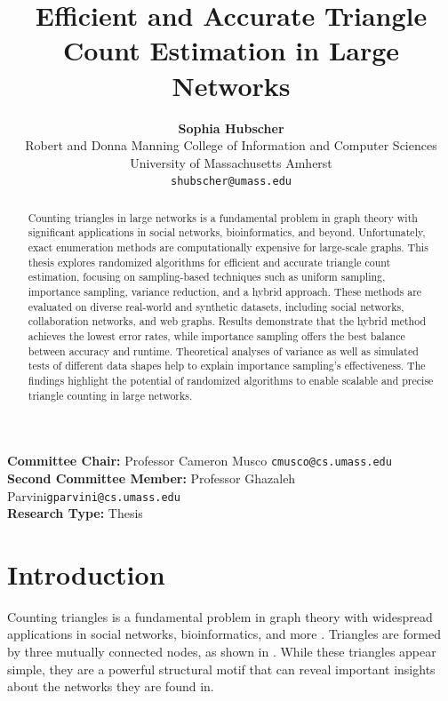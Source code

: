 \documentclass[11pt, margin=1in]{article}
\title{Efficient and Accurate Triangle Count Estimation in Large Networks}
\date{}
\author{
  \textbf{Sophia Hubscher}\\
  Robert and Donna Manning College of Information and Computer Sciences\\
  University of Massachusetts Amherst\\
  \texttt{shubscher@umass.edu}\\
}
\begin{document}
\maketitle

\vfill

\noindent\textbf{Committee Chair: }Professor Cameron Musco
\;\;\;\texttt{cmusco@cs.umass.edu} \\
\textbf{Second Committee Member: }Professor Ghazaleh Parvini\;\;\;\texttt{gparvini@cs.umass.edu} \\
\textbf{Research Type: } Thesis \\

\newpage

\begin{abstract}
Counting triangles in large networks is a fundamental problem in graph theory with significant applications in social networks, bioinformatics, and beyond.
Unfortunately, exact enumeration methods are computationally expensive for large-scale graphs.
This thesis explores randomized algorithms for efficient and accurate triangle count estimation, focusing on sampling-based techniques such as uniform sampling, importance sampling, variance reduction, and a hybrid approach.
These methods are evaluated on diverse real-world and synthetic datasets, including social networks, collaboration networks, and web graphs.
Results demonstrate that the hybrid method achieves the lowest error rates, while importance sampling offers the best balance between accuracy and runtime.
Theoretical analyses of variance as well as simulated tests of different data shapes help to explain importance sampling's effectiveness.
The findings highlight the potential of randomized algorithms to enable scalable and precise triangle counting in large networks.
\end{abstract}

\newpage

{
\singlespacing
\tableofcontents
}

\newpage

\section{Introduction}

Counting triangles is a fundamental problem in graph theory with widespread applications in social networks, bioinformatics, and more \cite{lovasz_large_2012,wimmer_beyond_2010,rougemont_dna_2003,eckmann_curvature_2002}.
Triangles are formed by three mutually connected nodes, as shown in .
While these triangles appear simple, they are a powerful structural motif that can reveal important insights about the networks they are found in.
\end{document}
